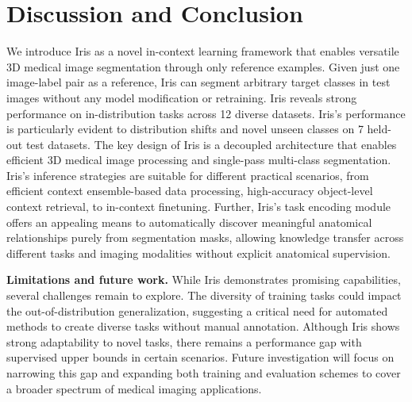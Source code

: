 \section{Discussion and Conclusion}

We introduce Iris as a novel in-context learning framework that enables versatile 3D medical image segmentation through only reference examples. Given just one image-label pair as a reference, Iris can segment arbitrary target classes in test images without any model modification or retraining. Iris reveals strong performance on in-distribution tasks across 12 diverse datasets. Iris's performance is particularly evident to distribution shifts and novel unseen classes on 7 held-out test datasets. The key design of Iris is a decoupled architecture that enables efficient 3D medical image processing and single-pass multi-class segmentation. Iris's inference strategies are suitable for different practical scenarios, from efficient context ensemble-based data processing, high-accuracy object-level context retrieval, to in-context finetuning. Further, Iris's task encoding module offers an appealing means to automatically discover meaningful anatomical relationships purely from segmentation masks, allowing knowledge transfer across different tasks and imaging modalities without explicit anatomical supervision.

\noindent\textbf{Limitations and future work.} While Iris demonstrates promising capabilities, several challenges remain to explore. The diversity of training tasks could impact the out-of-distribution generalization, suggesting a critical need for automated methods to create diverse tasks without manual annotation. Although Iris shows strong adaptability to novel tasks, there remains a performance gap with supervised upper bounds in certain scenarios. Future investigation will focus on narrowing this gap and expanding both training and evaluation schemes to cover a broader spectrum of medical imaging applications.